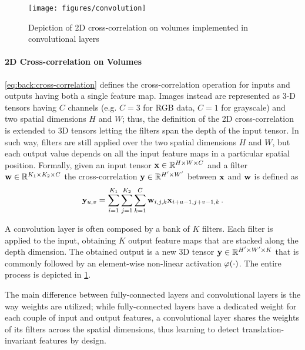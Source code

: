 \begin{figure}
    \centering
    \texttt{[image: figures/convolution]}
    \caption{Depiction of 2D cross-correlation on volumes implemented in convolutional layers}
    \label{fig:back:convolution}
\end{figure}

\paragraph{2D Cross-correlation on Volumes}
\ref{eq:back:cross-correlation} defines the cross-correlation operation for inputs and outputs having both a single feature map.
Images instead are represented as 3-D tensors having $C$ channels (e.g. $C=3$ for RGB data, $C=1$ for grayscale) and two spatial dimensions $H$ and $W$;
thus, the definition of the 2D cross-correlation is extended to 3D tensors letting the filters span the depth of the input tensor.
In such way, filters are still applied over the two spatial dimensions $H$ and $W$, but each output value depends on all the input feature maps in a particular spatial position.
Formally, given an input tensor $\mathbf{x} \in \mathbb{R}^{H \times W \times C}$ and a filter $\mathbf{w} \in \mathbb{R}^{K_1 \times K_2 \times C}$ the cross-correlation $\mathbf{y} \in \mathbb{R}^{H' \times W'}$ between $\mathbf{x}$ and $\mathbf{w}$ is defined as
%
\begin{equation}\label{eq:back:channel-cross-correlation}
    \mathbf{y}_{u,v} = \sum_{i=1}^{K_1} \sum_{j=1}^{K_2} \sum_{k=1}^C \mathbf{w}_{i,j,k} \mathbf{x}_{i+u-1,j+v-1,k} \,.
\end{equation}

A convolution layer is often composed by a bank of $K$ filters.
Each filter is applied to the input, obtaining $K$ output feature maps that are stacked along the depth dimension.
The obtained output is a new 3D tensor $\mathbf{y} \in \mathbb{R}^{H' \times W' \times K}$ that is commonly followed by an element-wise non-linear activation $\varphi(\cdot)$.
The entire process is depicted in \ref{fig:back:convolution}.

The main difference between fully-connected layers and convolutional layers is the way weights are utilized;
while fully-connected layers have a dedicated weight for each couple of input and output features, a convolutional layer shares the weights of its filters across the spatial dimensions, thus learning to detect translation-invariant features by design.

